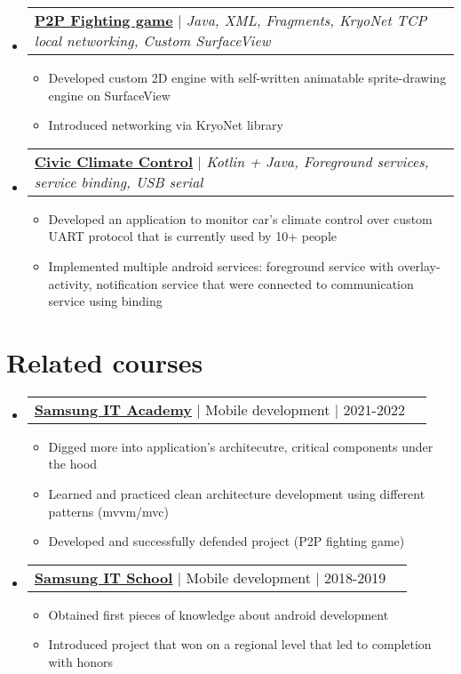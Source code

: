 \documentclass[a4paper,11pt]{article}
\makeatletter
\newcommand{\resumeItem}[1]{
  \item\small{
    {#1 \vspace{-2pt}}
  }
}
\newcommand{\resumeProjectHeading}[2]{
    \item
    \begin{tabular*}{0.97\textwidth}{l@{\extracolsep{\fill}}r}
      \small#1 & #2 \\
    \end{tabular*}\vspace{-7pt}
}
\newcommand{\resumeSubHeadingListStart}{\begin{itemize}[leftmargin=0.15in, label={}]}
\newcommand{\resumeSubHeadingListEnd}{\end{itemize}}
\newcommand{\resumeItemListStart}{\begin{itemize}}
\newcommand{\resumeItemListEnd}{\end{itemize}\vspace{-5pt}}
\makeatother
\begin{document}
    \resumeSubHeadingListStart
      \resumeProjectHeading
          {\href{https://github.com/Snow4DV/p2p-fighting-game}{\textbf{P2P Fighting game}} $|$ \textit{Java, XML, Fragments, KryoNet TCP local networking, Custom SurfaceView}}{ }
          \resumeItemListStart
            \resumeItem{Developed custom 2D engine with self-written animatable sprite-drawing engine on SurfaceView}
            \resumeItem{Introduced networking via KryoNet library}
          \resumeItemListEnd
    \resumeSubHeadingListEnd


    \resumeSubHeadingListStart
      \resumeProjectHeading
          {\href{https://github.com/Snow4DV/CivicClimateControl}{\textbf{Civic Climate Control}} $|$ \textit{Kotlin + Java, Foreground services, service binding, USB serial}}{ }
          \resumeItemListStart
            \resumeItem{Developed an application to monitor car's climate control over custom UART protocol that is currently used by 10+ people}
            \resumeItem{Implemented multiple android services: foreground service with overlay-activity, notification service that were connected to communication service using binding}
          \resumeItemListEnd
    \resumeSubHeadingListEnd


\section{Related courses}
    \resumeSubHeadingListStart
      \resumeProjectHeading
          {\href{https://github.com/Snow4DV/comapr-android}{\textbf{Samsung IT Academy}} $|$ Mobile development $|$ 2021-2022}{ }
          \resumeItemListStart
            \resumeItem{Digged more into application's architecutre, critical components under the hood }
            \resumeItem{Learned and practiced clean architecture development using different patterns (mvvm/mvc) }
            \resumeItem{Developed and successfully defended project (P2P fighting game) }
          \resumeItemListEnd
    \resumeSubHeadingListEnd

    \resumeSubHeadingListStart
      \resumeProjectHeading
          {\href{https://github.com/Snow4DV/comapr-android}{\textbf{Samsung IT School}} $|$ Mobile development $|$ 2018-2019}{ }
          \resumeItemListStart
            \resumeItem{Obtained first pieces of knowledge about android development}
            \resumeItem{Introduced project that won on a regional level that led to completion with honors }
          \resumeItemListEnd
    \resumeSubHeadingListEnd
\end{document}
